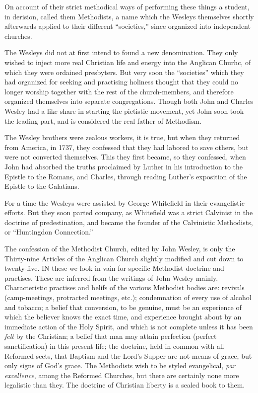 \documentclass[
]{book}
\begin{document}
On account of their strict methodical ways of performing these things a student, in derision, called them Methodists, a name which the Wesleys themselves shortly afterwards applied to their different ``societies,'' since organized into independent churches.

The Wesleys did not at first intend to found a new denomination. They only wished to inject more real Christian life and energy into the Anglican Churhc, of which they were ordained presbyters. But very soon the ``societies'' which they had organized for seeking and practising holiness thought that they could no longer worship together with the rest of the church-members, and therefore organized themselves into separate congregations. Though both John and Charles Wesley had a like share in starting the pietistic movement, yet John soon took the leading part, and is considered the real father of Methodism.

The Wesley brothers were zealous workers, it is true, but when they returned from America, in 1737, they confessed that they had labored to save others, but were not converted themselves. This they first became, so they confessed, when John had absorbed the truths proclaimed by Luther in his introduction to the Epistle to the Romans, and Charles, through reading Luther's exposition of the Epistle to the Galatians.

For a time the Wesleys were assisted by George Whitefield in their evangelistic efforts. But they soon parted company, as Whitefield was a strict Calvinist in the doctrine of predestination, and became the founder of the Calvinistic Methodists, or ``Huntingdon Connection.''

The confession of the Methodist Church, edited by John Wesley, is only the Thirty-nine Articles of the Anglican Church slightly modified and cut down to twenty-five. IN these we look in vain for specific Methodist doctrine and practises. These are inferred from the writings of John Wesley mainly. Characteristic practises and belifs of the various Methodist bodies are: revivals (camp-meetings, protracted meetings, etc.); condemnation of every use of alcohol and tobacco; a belief that conversion, to be genuine, must be an experience of which the believer knows the exact time, and experience brought about by an immediate action of the Holy Spirit, and which is not complete unless it has been \emph{felt} by the Christian; a belief that man may attain perfection (perfect sanctification) in this present life; the doctrine, held in common with all Reformed sects, that Baptism and the Lord's Supper are not means of grace, but only signs of God's grace. The Methodists wish to be styled evangelical, \emph{par excellence}, among the Reformed Churches, but there are certainly none more legalistic than they. The doctrine of Christian liberty is a sealed book to them.
\end{document}
